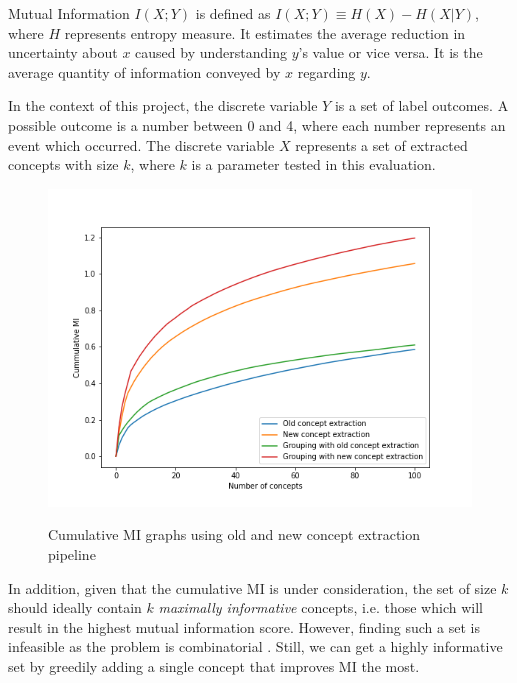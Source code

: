 Mutual Information $I(X;Y)$ \cite{RefWorks:RefID:30-mackay2004information} is defined as $I(X; Y) \equiv H(X) - H(X|Y)$, where $H$ represents entropy measure. 
It estimates the average reduction in uncertainty about $x$ caused by understanding $y$'s value or vice versa. 
It is the average quantity of information conveyed by $x$ regarding $y$.

In the context of this project, the discrete variable $Y$ is a set of label outcomes. A possible outcome is a number between 0 and 4, where each number represents an event which occurred.
The discrete variable $X$ represents a set of extracted concepts with size $k$, where $k$ is a parameter tested in this evaluation.

\begin{figure}[h]
\caption{Cumulative MI graphs using old and new concept extraction pipeline}
\centering
\includegraphics[width=\textwidth]{concept-bottleneck-pipeline/Cummulative MI graphs.png}
\label{cummulative-mi-graphs}
\end{figure}

In addition, given that the cumulative MI is under consideration, the set of size $k$ should ideally contain $k$ \emph{maximally informative} concepts, i.e. those which will result in the highest mutual information score.
However, finding such a set is infeasible as the problem is combinatorial \cite{RefWorks:RefID:16-2021automatic}. Still, we can get a highly informative set by greedily adding a single concept that improves MI the most. 


